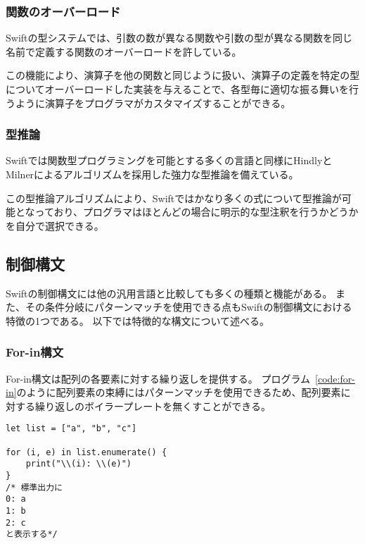 \subsubsection{関数のオーバーロード}

Swiftの型システムでは、引数の数が異なる関数や引数の型が異なる関数を同じ名前で定義する関数のオーバーロードを許している。

この機能により、演算子を他の関数と同じように扱い、演算子の定義を特定の型についてオーバーロードした実装を与えることで、各型毎に適切な振る舞いを行うように演算子をプログラマがカスタマイズすることができる。

\subsubsection{型推論}

Swiftでは関数型プログラミングを可能とする多くの言語と同様にHindlyとMilnerによるアルゴリズムを採用した強力な型推論を備えている。

この型推論アルゴリズムにより、Swiftではかなり多くの式について型推論が可能となっており、プログラマはほとんどの場合に明示的な型注釈を行うかどうかを自分で選択できる。


\subsection{制御構文}

Swiftの制御構文には他の汎用言語と比較しても多くの種類と機能がある。
また、その条件分岐にパターンマッチを使用できる点もSwiftの制御構文における特徴の1つである。
以下では特徴的な構文について述べる。

\subsubsection{For-in構文}

For-in構文は配列の各要素に対する繰り返しを提供する。
プログラム~\ref{code:for-in}のように配列要素の束縛にはパターンマッチを使用できるため、配列要素に対する繰り返しのボイラープレートを無くすことができる。

\begin{lstlisting}[caption=For-in制御構文, label=code:for-in]
let list = ["a", "b", "c"]

for (i, e) in list.enumerate() {
    print("\\(i): \\(e)")
}
/* 標準出力に
0: a
1: b
2: c
と表示する*/
\end{lstlisting}

